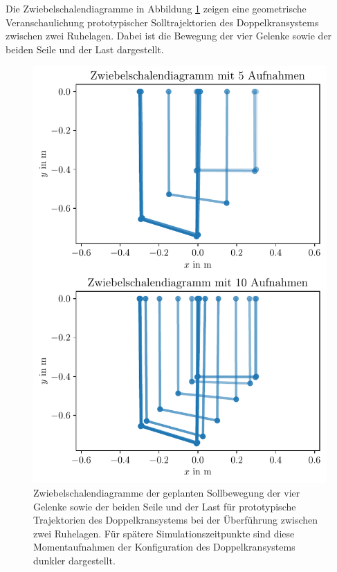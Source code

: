 Die Zwiebelschalendiagramme in Abbildung \ref{onion_skinned_reference_traj} zeigen eine geometrische Veranschaulichung prototypischer Solltrajektorien des Doppelkransystems zwischen zwei Ruhelagen. Dabei ist die Bewegung der vier Gelenke sowie der beiden Seile und der Last dargestellt.

\begin{figure}[H]
	\begin{center}
		\includegraphics[scale=1]{Pictures/onion_skinned_dynamic}
	\end{center}
	\caption[Zwiebelschalendiagramm Ruhelagenüberführung prototypische Solltrajektorien]
	{Zwiebelschalendiagramme der geplanten Sollbewegung der vier Gelenke sowie der beiden Seile und der Last für prototypische Trajektorien des Doppelkransystems bei der Überführung zwischen zwei Ruhelagen. Für spätere Simulationszeitpunkte sind diese Momentaufnahmen der Konfiguration des Doppelkransystems dunkler dargestellt.}
	\label{onion_skinned_reference_traj}
\end{figure}

